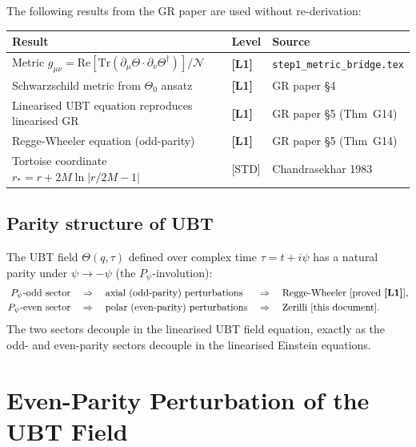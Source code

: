 \documentclass[12pt,a4paper]{article}
\theoremstyle{definition}
\theoremstyle{remark}
\newcommand{\Lone}{\textbf{[L1]}}
\newcommand{\Tr}{\mathrm{Tr}}
\newcommand{\re}{\mathrm{Re}}
\newcommand{\calN}{\mathcal{N}}
\begin{document}
The following results from the GR paper are used without re-derivation:

\begin{tcolorbox}[colback=green!5!white,colframe=green!50!black,
  title={Pre-Proved Inputs (GR paper, not re-derived here)}]
\begin{center}
\begin{tabular}{lll}
\toprule
\textbf{Result} & \textbf{Level} & \textbf{Source} \\
\midrule
Metric $g_{\mu\nu} = \re[\Tr(\partial_\mu\Theta\cdot\partial_\nu\Theta^\dagger)]/\calN$ & \Lone &
  \texttt{step1\_metric\_bridge.tex} \\
Schwarzschild metric from $\Theta_0$ ansatz & \Lone &
  GR paper §4 \\
Linearised UBT equation reproduces linearised GR & \Lone &
  GR paper §5 (Thm~G14) \\
Regge-Wheeler equation (odd-parity) & \Lone &
  GR paper §5 (Thm~G14) \\
Tortoise coordinate $r_* = r + 2M\ln|r/2M-1|$ & [STD] &
  Chandrasekhar 1983 \\
\bottomrule
\end{tabular}
\end{center}
\end{tcolorbox}

\subsection{Parity structure of UBT}

The UBT field $\Theta(q,\tau)$ defined over complex time $\tau = t + i\psi$
has a natural parity under $\psi \to -\psi$ (the $P_\psi$-involution):
\begin{align}
  P_\psi\text{-odd sector} &\quad\Rightarrow\quad \text{axial (odd-parity) perturbations}
    &&\Rightarrow\quad \text{Regge-Wheeler [proved \Lone]}, \\
  P_\psi\text{-even sector} &\quad\Rightarrow\quad \text{polar (even-parity) perturbations}
    &&\Rightarrow\quad \text{Zerilli [this document]}.
\end{align}
The two sectors decouple in the linearised UBT field equation, exactly as
the odd- and even-parity sectors decouple in the linearised Einstein equations.

\section{Even-Parity Perturbation of the UBT Field}
\label{sec:perturbation}
\end{document}
